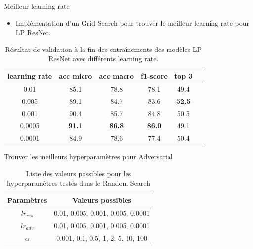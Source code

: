 \documentclass[11pt]{beamer}
\begin{document}
\begin{frame}{Meilleur learning rate}
    \begin{itemize}
        \item Implémentation d'un Grid Search pour trouver le meilleur learning rate pour LP ResNet.
    \end{itemize}
    \begin{table}[ht]
        \centering
        \begin{tabular}{cccccc}
        \toprule
        learning rate & acc micro & acc macro & f1-score & top 3 \\
        \midrule
        0.01 & 85.1 & 78.8 & 78.1 & 49.4 \\
        0.005 & 89.1 & 84.7 & 83.6 & \textbf{52.5} \\
        0.001 & 90.4 & 85.7 & 84.8 & 50.5 \\
        0.0005 & \textbf{91.1} & \textbf{86.8} & \textbf{86.0} & 49.1 \\
        0.0001 & 84.9 & 78.6 & 77.4 & 50.4 \\
        \bottomrule
        \end{tabular}
        \caption{Résultat de validation à la fin des entraînements des modèles LP ResNet avec différents learning rate.}
        \label{tab:gridsearch}
    \end{table}
\end{frame}

\begin{frame}{Trouver les meilleurs hyperparamètres pour Adversarial}
    \begin{table}
        \centering
        \begin{tabular}{cc}
            \toprule
            Paramètres & Valeurs possibles\\
            \midrule
            $lr_{res}$ & 0.01, 0.005, 0.001, 0.005, 0.0001\\
            $lr_{adv}$ & 0.01, 0.005, 0.001, 0.005, 0.0001\\
            $\alpha$ & 0.001, 0.1, 0.5, 1, 2, 5, 10, 100\\
            \bottomrule
        \end{tabular}
        \caption{Liste des valeurs possibles pour les hyperparamètres testés dans le Random Search}
        \label{tab:random search possibilities}
    \end{table}
\end{frame}
\end{document}
